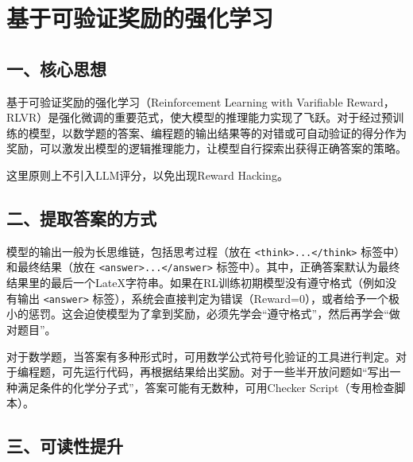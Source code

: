 \setcounter{section}{3}

\hypertarget{ux57faux4e8eux53efux9a8cux8bc1ux5956ux52b1ux7684ux5f3aux5316ux5b66ux4e60}{%
\section{基于可验证奖励的强化学习}\label{ux57faux4e8eux53efux9a8cux8bc1ux5956ux52b1ux7684ux5f3aux5316ux5b66ux4e60}}

\hypertarget{ux4e00ux6838ux5fc3ux601dux60f3-6}{%
\subsection{一、核心思想}\label{ux4e00ux6838ux5fc3ux601dux60f3-6}}

基于可验证奖励的强化学习（Reinforcement Learning with Varifiable Reward，RLVR）是强化微调的重要范式，使大模型的推理能力实现了飞跃。对于经过预训练的模型，以数学题的答案、编程题的输出结果等的对错或可自动验证的得分作为奖励，可以激发出模型的逻辑推理能力，让模型自行探索出获得正确答案的策略。

这里原则上不引入LLM评分，以免出现Reward Hacking。

\hypertarget{ux4e8cux63d0ux53d6ux7b54ux6848ux7684ux65b9ux5f0f}{%
\subsection{二、提取答案的方式}\label{ux4e8cux63d0ux53d6ux7b54ux6848ux7684ux65b9ux5f0f}}

模型的输出一般为长思维链，包括思考过程（放在 \texttt{\textless{}think\textgreater{}...\textless{}/think\textgreater{}} 标签中）和最终结果（放在 \texttt{\textless{}answer\textgreater{}...\textless{}/answer\textgreater{}} 标签中）。其中，正确答案默认为最终结果里的最后一个LateX字符串。如果在RL训练初期模型没有遵守格式（例如没有输出 \texttt{\textless{}answer\textgreater{}} 标签），系统会直接判定为错误（Reward=0），或者给予一个极小的惩罚。这会迫使模型为了拿到奖励，必须先学会``遵守格式''，然后再学会``做对题目''。

对于数学题，当答案有多种形式时，可用数学公式符号化验证的工具进行判定。对于编程题，可先运行代码，再根据结果给出奖励。对于一些半开放问题如``写出一种满足条件的化学分子式''，答案可能有无数种，可用Checker Script（专用检查脚本）。

\hypertarget{ux4e09ux53efux8bfbux6027ux63d0ux5347}{%
\subsection{三、可读性提升}\label{ux4e09ux53efux8bfbux6027ux63d0ux5347}}

